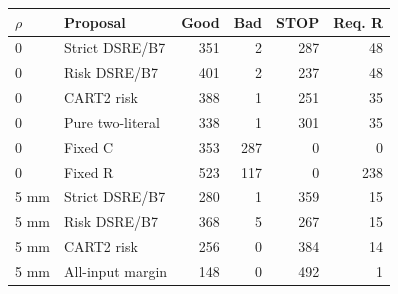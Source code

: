 \begin{tabular}{llrrrr}\toprule
$\rho$ & Proposal & Good & Bad & STOP & Req. R\\\midrule
0 & Strict DSRE/B7 & 351 & 2 & 287 & 48\\
0 & Risk DSRE/B7 & 401 & 2 & 237 & 48\\
0 & CART2 risk & 388 & 1 & 251 & 35\\
0 & Pure two-literal & 338 & 1 & 301 & 35\\
0 & Fixed C & 353 & 287 & 0 & 0\\
0 & Fixed R & 523 & 117 & 0 & 238\\
5 mm & Strict DSRE/B7 & 280 & 1 & 359 & 15\\
5 mm & Risk DSRE/B7 & 368 & 5 & 267 & 15\\
5 mm & CART2 risk & 256 & 0 & 384 & 14\\
5 mm & All-input margin & 148 & 0 & 492 & 1\\
\bottomrule\end{tabular}
